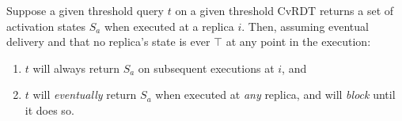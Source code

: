 \begin{thm}
  \label{thm:determinism-of-threshold-queries}
  Suppose a given threshold query $t$ on a given threshold CvRDT
  returns a set of activation states $S_a$ when executed at a replica
  $i$.  Then, assuming eventual delivery and that no replica's state
  is ever $\top$ at any point in the execution:
  \begin{enumerate}
  \item \label{thm:this-replica} $t$ will always return $S_a$ on
    subsequent executions at $i$, and
  \item \label{thm:any-replica} $t$ will \emph{eventually} return
    $S_a$ when executed at \emph{any} replica, and will \emph{block}
    until it does so.
  \end{enumerate}
\end{thm}
